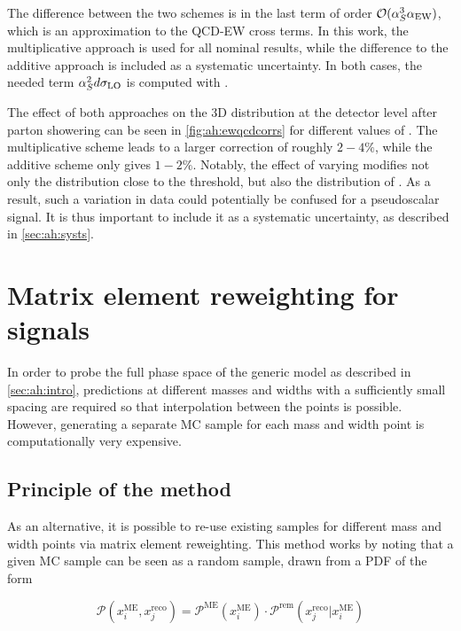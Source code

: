The difference between the two schemes is in the last term of order $\mathcal{O}(\alpha_S^3\alpha_{\mathrm{EW}})$, which is an approximation to the QCD-EW cross terms. In this work, the multiplicative approach is used for all nominal results, while the difference to the additive approach is included as a systematic uncertainty. In both cases, the needed term $\alpha_S^2 d \sigma_{\mathrm{LO}}$ is computed with \madgraph.

The effect of both approaches on the 3D \mttchelchan distribution at the detector level after parton showering can be seen in \cref{fig:ah:ewqcdcorrs} for different values of \yt. The multiplicative scheme leads to a larger correction of roughly $2-4\%$, while the additive scheme only gives $1-2\%$. Notably, the effect of varying \yt modifies not only the \mtt distribution close to the \ttbar threshold, but also the distribution of \chel. As a result, such a variation in data could potentially be confused for a pseudoscalar signal. It is thus important to include it as a systematic uncertainty, as described in \cref{sec:ah:systs}.


\section{Matrix element reweighting for \AH signals}
\label{sec:ah:mereweighting}

In order to probe the full phase space of the generic \AH model as described in \cref{sec:ah:intro}, predictions at different \AH masses and widths with a sufficiently small spacing are required so that interpolation between the points is possible. However, generating a separate MC sample for each mass and width point is computationally very expensive.

\subsection{Principle of the method}

As an alternative, it is possible to re-use existing samples for different mass and width points via matrix element reweighting. This method works by noting that a given MC sample can be seen as a random sample, drawn from a PDF of the form

\begin{equation}
\label{eq:ah:merewprob}
    \mathcal{P}(x_i^{\mathrm{ME}}, x_j^{\mathrm{reco}}) = \mathcal{P}^{\mathrm{ME}} (x_i^{\mathrm{ME}}) \cdot \mathcal{P}^{\mathrm{rem}} (x_j^{\mathrm{reco}} | x_i^{\mathrm{ME}})
\end{equation}

